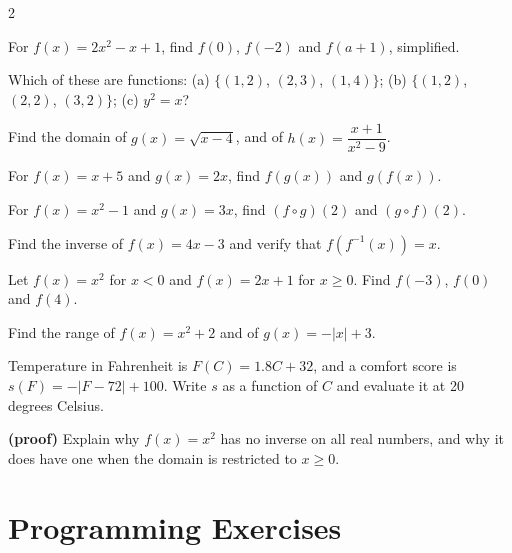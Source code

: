 \begin{multicols}{2}
\begin{exercises}
\item For $f(x) = 2x^2 - x + 1$, find $f(0)$, $f(-2)$ and $f(a + 1)$, simplified.
\item Which of these are functions: (a) $\{(1, 2)$, $(2, 3)$, $(1, 4)\}$; (b) $\{(1, 2)$, $(2, 2)$, $(3, 2)\}$; (c) $y^2 = x$?
\item Find the domain of $g(x) = \sqrt{x - 4}$, and of $h(x) = \dfrac{x + 1}{x^2 - 9}$.
\item For $f(x) = x + 5$ and $g(x) = 2x$, find $f(g(x))$ and $g(f(x))$.
\item For $f(x) = x^2 - 1$ and $g(x) = 3x$, find $(f \circ g)(2)$ and $(g \circ f)(2)$.
\item Find the inverse of $f(x) = 4x - 3$ and verify that $f(f^{-1}(x)) = x$.
\item Let $f(x) = x^2$ for $x < 0$ and $f(x) = 2x + 1$ for $x \ge 0$. Find $f(-3)$, $f(0)$ and $f(4)$.
\item Find the range of $f(x) = x^2 + 2$ and of $g(x) = -|x| + 3$.
\item Temperature in Fahrenheit is $F(C) = 1.8C + 32$, and a comfort score is $s(F) = -|F - 72| + 100$. Write $s$ as a function of $C$ and evaluate it at 20 degrees Celsius.
\item \textbf{(proof)} Explain why $f(x) = x^2$ has no inverse on all real numbers, and why it does have one when the domain is restricted to $x \ge 0$.
\end{exercises}
\end{multicols}

\section{Programming Exercises}

